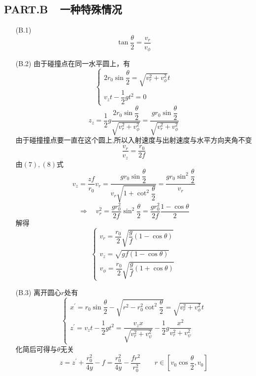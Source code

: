 \documentclass{article}
\begin{document}
\subsection*{PART.B\ \ 一种特殊情况}
\begin{itemize}
    \item[(B.1)]\begin{equation}\tan\dfrac{\theta}{2}=\frac{v_{r}}{v_{\phi}}\end{equation}
    \item[(B.2)]由于碰撞点在同一水平圆上，有
    \begin{equation}\begin{cases}2r_{0}\sin\dfrac{\theta}{2}=\sqrt{v_{r}^{2}+v_{\phi}^{2}}t\\v_{z}t-\dfrac{1}{2}gt^{2}=0\end{cases}\end{equation}
    \begin{equation}z_{z}=\dfrac{1}{2}g\frac{2r_{0}\sin\dfrac{\theta}{2}}{\sqrt{v_{r}^{2}+v_{\phi}^{2}}}=\dfrac{gr_{0}\sin\dfrac{\theta}{2}}{\sqrt{v_{r}^{2}+v_{\phi}^{2}}}\end{equation}
    由于碰撞撞点要一直在这个圆上,所以入射速度与出射速度与水平方向夹角不变
    \begin{equation}\dfrac{v_r}{v_z}=\dfrac{r_0}{2f}\end{equation}
    由$(7),(8)$式
    \begin{equation}v_z=\dfrac{zf}{r_{0}}v_r=\frac{gr_{0}\sin\dfrac\theta2}{v_r\sqrt{1+\cot^{2}\dfrac\theta2}}=\dfrac{gr_{0}\sin^{2}\dfrac\theta2}{v_r}\end{equation}
    \begin{equation}\Rightarrow\quad v_r^{2}=\dfrac{gr_{0}^{2}}{2f}\sin^{2}\frac{\theta}{2}=\dfrac{gr_{0}^{2}}{2f}\dfrac{1-\cos\theta}{2}\end{equation}
    解得
    \begin{equation}\begin{cases}v_{r}=\dfrac{r_{0}}{2}\sqrt{\dfrac{g}{f}(1-\cos\theta)}\\v_{z}=\sqrt{gf(1-\cos\theta)}\\v_{\phi}=\dfrac{r_{0}}{2}\sqrt{\dfrac{g}{f}(1+\cos\theta)}\end{cases}\end{equation}
    \item[(B.3)]离开圆心$r$处有
    \begin{equation}\begin{cases}x^{\prime}=r_0\sin\dfrac{\theta}{2}-\sqrt{r^2-r_0^2\cot^2\dfrac{\theta}{2}}=\sqrt{v_{r}^2+v_{\phi}^2}t\\
        z^{\prime}=v_zt-\dfrac{1}{2}gt^2=\dfrac{v_zx}{\sqrt{v_{r}^2+v_{\psi}^2}}-\dfrac12g\dfrac{x^2}{v_{r}^2+v_{\psi}^2}\end{cases}\end{equation}
        化简后可得与$\theta$无关
        \begin{equation}z=z^{\prime}+\frac{r_{0}^{2}}{4y}-f=\frac{r_{0}^{2}}{4y}-\frac{fr^{2}}{r_{0}^{2}}\qquad r\in[v_{0}\cos\dfrac\theta2,v_{0}]\end{equation} 
\end{itemize}
\end{document}
